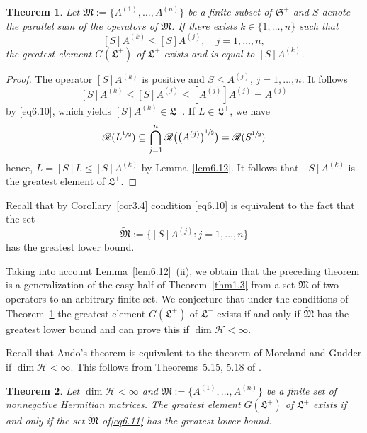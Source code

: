 \documentclass[12pt, a4paper, reqno, twoside]{amsart}
\numberwithin{equation}{section}
\newcommand{\frakS}{\mathfrak S}
\newcommand{\frakL}{\mathfrak L}
\newcommand{\frakM}{\mathfrak M}
\newtheorem{theorem}{Theorem}[section]
\theoremstyle{definition}
\theoremstyle{remark}
\theoremstyle{mystyle}
\begin{document}
\begin{theorem}
\label{thm6.13}
Let $\frakM:=\bigl\{A^{(1)},\ldots,A^{(n)}\bigr\}$ be a finite subset
of $\frakS^{+}$ and $S$ denote the parallel sum of the operators of
$\frakM$. If there exists $k\in\{1,\ldots,n\}$ such that
\begin{equation}
\label{eq6.10}
[S]A^{(k)} \leq [S]A^{(j)},\quad j=1,\ldots,n,  
\end{equation}
the greatest element $G(\frakL^{+})$ of $\frakL^{+}$ exists and is equal
to $[S]A^{(k)}$.
\end{theorem}

\begin{proof}
The operator $[S]A^{(k)}$ is positive and $S\leq A^{(j)}$,
$j=1,\ldots,n$. It follows
\[
[S]A^{(k)}\leq[S]A^{(j)}\leq[A^{(j)}]A^{(j)}=A^{(j)}
\]  
by \eqref{eq6.10}, which yields $[S]A^{(k)}\in\frakL^{+}$. If
$L\in\frakL^{+}$, we have
\[
  \mathscr R(L^{\sfrac{1}{2}})\subseteq \bigcap_{j=1}^{n}
  \mathscr R\bigl(\bigl(A^{(j)}\bigr)^{\sfrac{1}{2}}\bigr)
  = \mathscr R(S^{\sfrac{1}{2}})
\]
hence, $L=[S]L\leq[S]A^{(k)}$ by Lemma~\ref{lem6.12}. It follows that
$[S]A^{(k)}$ is the greatest element of $\frakL^{+}$.
\end{proof}

Recall that by Corollary~\ref{cor3.4} condition \eqref{eq6.10} is
equivalent to the fact that the set
\begin{equation}
\label{eq6.11}
\widetilde{\frakM} := \bigl\{[S]A^{(j)} \colon j=1,\ldots,n\bigr\}
\end{equation}
has the greatest lower bound.

Taking into account Lemma~\ref{lem6.12}~(ii), we obtain that the
preceding theorem is a generalization of the easy half of
Theorem~\ref{thm1.3} from a set $\frakM$ of two operators to an
arbitrary finite set. We conjecture that under the conditions of
Theorem~\ref{thm6.13} the greatest element $G(\frakL^{+})$ of
$\frakL^{+}$ exists if and only if $\widetilde{\frakM}$ has the greatest
lower bound and can prove this if $\dim \mathscr H < \infty$. 

Recall that Ando's theorem is equivalent to the theorem of Moreland
and Gudder \cite{MorelandGudder1999} if $\dim\mathscr H <\infty$. This
follows from Theorems~5.15, 5.18 of \cite{Ando2005}.

\begin{theorem}
\label{thm6.14}
Let $\dim\mathscr H < \infty$ and
$\frakM:=\bigl\{A^{(1)},\ldots,A^{(n)}\bigr\}$ be a finite set of
nonnegative Hermitian matrices. The greatest element $G(\frakL^{+})$ of
$\frakL^{+}$ exists if and only if the set $\widetilde{\frakM}$
of\eqref{eq6.11} has the greatest lower bound.  
\end{theorem}
\end{document}
